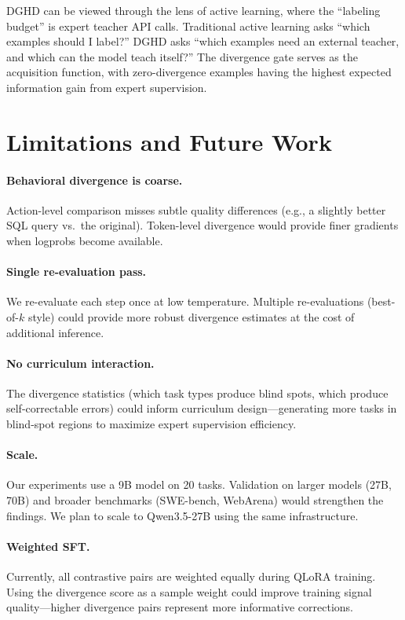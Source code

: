 \documentclass[11pt]{article}
\newcommand{\ours}{DGHD}
\begin{document}
\ours{} can be viewed through the lens of active learning, where the ``labeling budget'' is expert teacher API calls. Traditional active learning asks ``which examples should I label?'' \ours{} asks ``which examples need an external teacher, and which can the model teach itself?'' The divergence gate serves as the acquisition function, with zero-divergence examples having the highest expected information gain from expert supervision.

\section{Limitations and Future Work}
\label{sec:limitations}

\paragraph{Behavioral divergence is coarse.} Action-level comparison misses subtle quality differences (e.g., a slightly better SQL query vs.\ the original). Token-level divergence would provide finer gradients when logprobs become available.

\paragraph{Single re-evaluation pass.} We re-evaluate each step once at low temperature. Multiple re-evaluations (best-of-$k$ style) could provide more robust divergence estimates at the cost of additional inference.

\paragraph{No curriculum interaction.} The divergence statistics (which task types produce blind spots, which produce self-correctable errors) could inform curriculum design---generating more tasks in blind-spot regions to maximize expert supervision efficiency.

\paragraph{Scale.} Our experiments use a 9B model on 20 tasks. Validation on larger models (27B, 70B) and broader benchmarks (SWE-bench, WebArena) would strengthen the findings. We plan to scale to Qwen3.5-27B using the same infrastructure.

\paragraph{Weighted SFT.} Currently, all contrastive pairs are weighted equally during QLoRA training. Using the divergence score as a sample weight could improve training signal quality---higher divergence pairs represent more informative corrections.
\end{document}
